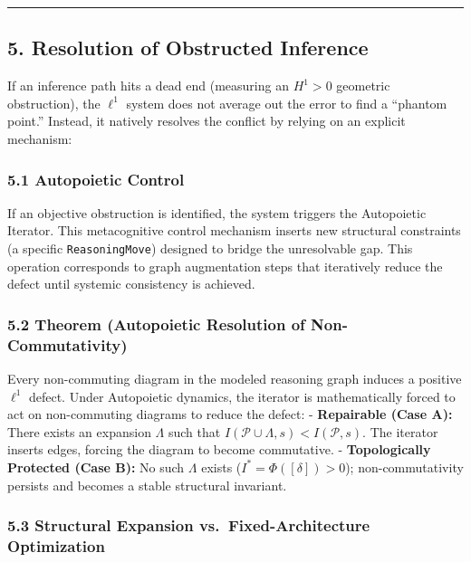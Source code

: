\documentclass[
]{article}
\begin{document}
\begin{center}\rule{0.5\linewidth}{0.5pt}\end{center}

\subsection{5. Resolution of Obstructed
Inference}\label{resolution-of-obstructed-inference}

If an inference path hits a dead end (measuring an \(H^1 > 0\) geometric
obstruction), the \(\ell^1\) system does not average out the error to
find a ``phantom point.'' Instead, it natively resolves the conflict by
relying on an explicit mechanism:

\subsubsection{5.1 Autopoietic Control}\label{autopoietic-control}

If an objective obstruction is identified, the system triggers the
Autopoietic Iterator. This metacognitive control mechanism inserts new
structural constraints (a specific \texttt{ReasoningMove}) designed to
bridge the unresolvable gap. This operation corresponds to graph
augmentation steps that iteratively reduce the defect until systemic
consistency is achieved.

\subsubsection{5.2 Theorem (Autopoietic Resolution of
Non-Commutativity)}\label{theorem-autopoietic-resolution-of-non-commutativity}

Every non-commuting diagram in the modeled reasoning graph induces a
positive \(\ell^1\) defect. Under Autopoietic dynamics, the iterator is
mathematically forced to act on non-commuting diagrams to reduce the
defect: - \textbf{Repairable (Case A):} There exists an expansion
\(\Lambda\) such that
\(I(\mathcal{P} \cup \Lambda, s) < I(\mathcal{P}, s)\). The iterator
inserts edges, forcing the diagram to become commutative. -
\textbf{Topologically Protected (Case B):} No such \(\Lambda\) exists
(\(I^* = \Phi([\delta]) > 0\)); non-commutativity persists and becomes a
stable structural invariant.

\subsubsection{5.3 Structural Expansion vs.~Fixed-Architecture
Optimization}\label{structural-expansion-vs.-fixed-architecture-optimization}
\end{document}
